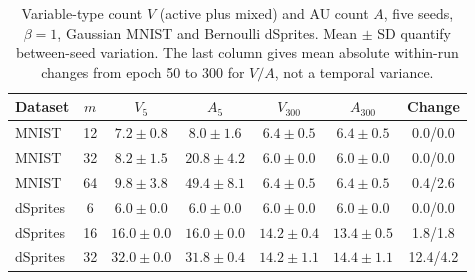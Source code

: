 \begin{table}[H]
\caption{Variable-type count $V$ (active plus mixed) and AU count $A$, five seeds, $\beta=1$, Gaussian MNIST and Bernoulli dSprites. Mean $\pm$ SD quantify between-seed variation. The last column gives mean absolute within-run changes from epoch 50 to 300 for $V/A$, not a temporal variance.}\label{tab:readouts}
\footnotesize
\setlength{\tabcolsep}{3.5pt}
\begin{tabular*}{\textwidth}{@{\extracolsep{\fill}}lcccccc@{}}
\toprule
Dataset & $m$ & $V_5$ & $A_5$ & $V_{300}$ & $A_{300}$ & Change \\
\midrule
MNIST & 12 & $7.2 \pm 0.8$ & $8.0 \pm 1.6$ & $6.4 \pm 0.5$ & $6.4 \pm 0.5$ & 0.0/0.0 \\
MNIST & 32 & $8.2 \pm 1.5$ & $20.8 \pm 4.2$ & $6.0 \pm 0.0$ & $6.0 \pm 0.0$ & 0.0/0.0 \\
MNIST & 64 & $9.8 \pm 3.8$ & $49.4 \pm 8.1$ & $6.4 \pm 0.5$ & $6.4 \pm 0.5$ & 0.4/2.6 \\
dSprites & 6 & $6.0 \pm 0.0$ & $6.0 \pm 0.0$ & $6.0 \pm 0.0$ & $6.0 \pm 0.0$ & 0.0/0.0 \\
dSprites & 16 & $16.0 \pm 0.0$ & $16.0 \pm 0.0$ & $14.2 \pm 0.4$ & $13.4 \pm 0.5$ & 1.8/1.8 \\
dSprites & 32 & $32.0 \pm 0.0$ & $31.8 \pm 0.4$ & $14.2 \pm 1.1$ & $14.4 \pm 1.1$ & 12.4/4.2 \\
\bottomrule
\end{tabular*}
\end{table}
